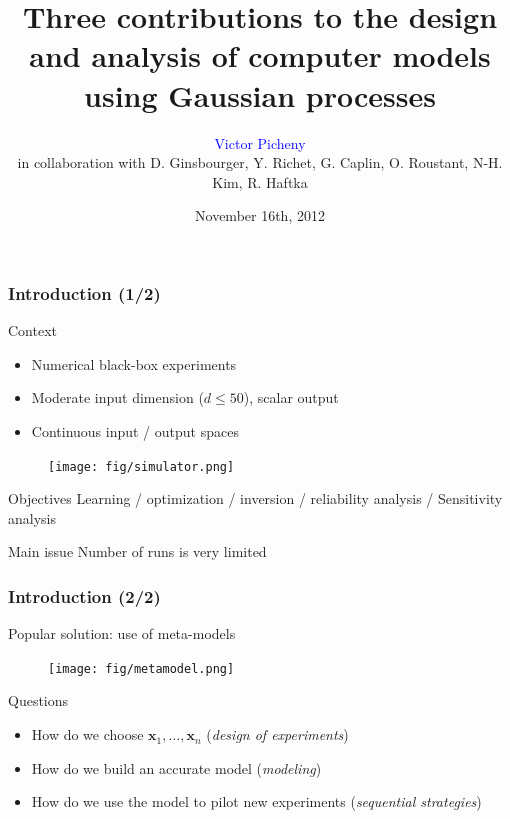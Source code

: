 \documentclass[10pt]{beamer}
\title[Learning and optimizing using Gaussian Processes]{Three contributions to the design and analysis of computer models using Gaussian processes}
\author[V. Picheny]{\textcolor{blue}{Victor Picheny}\\
in collaboration with D. Ginsbourger, Y. Richet, G. Caplin, O. Roustant, N-H. Kim, R. Haftka}
\date{November 16th, 2012}
\begin{document}
\frame{\titlepage}



\frame
{
\frametitle{Introduction (1/2)}
\begin{block}{Context}
\begin{itemize}
 \item Numerical black-box experiments
 \item Moderate input dimension ($d \leq 50$), scalar output
 \item Continuous input / output spaces
\end{itemize}
\end{block}

 \begin{figure}[h!] \centering	\texttt{[image: fig/simulator.png]} \end{figure}

\begin{block}{Objectives}
Learning / optimization / inversion / reliability analysis / Sensitivity analysis
\end{block}

\begin{block}{Main issue}
Number of runs is very limited
\end{block}
}

\frame
{
\frametitle{Introduction (2/2)}
\begin{block}{Popular solution: use of meta-models}
\end{block}
\vspace{-5mm}
\begin{figure}[h!] \centering	\texttt{[image: fig/metamodel.png]} \end{figure}
\vspace{-4mm}
\begin{block}{Questions}
\vspace{-2mm}
\begin{itemize}
 \item How do we choose $\mathbf{x}_1, \ldots, \mathbf{x}_n$ (\textit{design of experiments})
 \item How do we build an accurate model (\textit{modeling})
 \item How do we use the model to pilot new experiments (\textit{sequential strategies})
\end{itemize}
\end{block}
}
\end{document}
